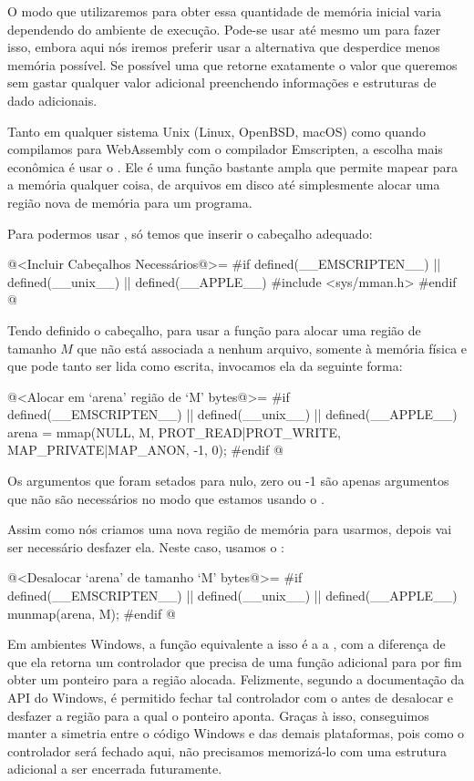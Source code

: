 O modo que utilizaremos para obter essa quantidade de memória inicial
varia dependendo do ambiente de execução. Pode-se usar até mesmo
um  para fazer isso, embora aqui nós iremos
preferir usar a alternativa que desperdice menos memória possível. Se
possível uma que retorne exatamente o valor que queremos sem gastar
qualquer valor adicional preenchendo informações e estruturas de dado
adicionais.

Tanto em qualquer sistema Unix (Linux, OpenBSD, macOS) como quando
compilamos para WebAssembly com o compilador Emscripten, a escolha
mais econômica é usar o . Ele é uma função bastante
ampla que permite mapear para a memória qualquer coisa, de arquivos em
disco até simplesmente alocar uma região nova de memória para um
programa.

Para podermos usar , só temos que inserir o cabeçalho
adequado:

\iniciocodigo
@<Incluir Cabeçalhos Necessários@>=
#if defined(__EMSCRIPTEN__) || defined(__unix__) || defined(__APPLE__)
#include <sys/mman.h>
#endif
@
\fimcodigo

Tendo definido o cabeçalho, para usar a função para alocar uma região
de tamanho $M$ que não está associada a nenhum arquivo, somente à
memória física e que pode tanto ser lida como escrita, invocamos ela
da seguinte forma:

\iniciocodigo
@<Alocar em `arena' região de `M' bytes@>=
#if defined(__EMSCRIPTEN__) || defined(__unix__) || defined(__APPLE__)
arena = mmap(NULL, M, PROT_READ|PROT_WRITE, MAP_PRIVATE|MAP_ANON,
             -1, 0);
#endif
@
\fimcodigo

Os argumentos que foram setados para nulo, zero ou -1 são apenas
argumentos que não são necessários no modo que estamos usando
o .

Assim como nós criamos uma nova região de memória para usarmos, depois
vai ser necessário desfazer ela. Neste caso, usamos
o :

\iniciocodigo
@<Desalocar `arena' de tamanho `M' bytes@>=
#if defined(__EMSCRIPTEN__) || defined(__unix__) || defined(__APPLE__)
munmap(arena, M);
#endif
@
\fimcodigo

Em ambientes Windows, a função equivalente a isso é a
a , com a diferença de que ela retorna
um controlador que precisa de uma função adicional para por fim obter
um ponteiro para a região alocada. Felizmente, segundo a documentação
da API do Windows, é permitido fechar tal controlador com
o  antes de desalocar e desfazer a região
para a qual o ponteiro aponta. Graças à isso, conseguimos manter a
simetria entre o código Windows e das demais plataformas, pois como o
controlador será fechado aqui, não precisamos memorizá-lo com uma
estrutura adicional a ser encerrada futuramente.


